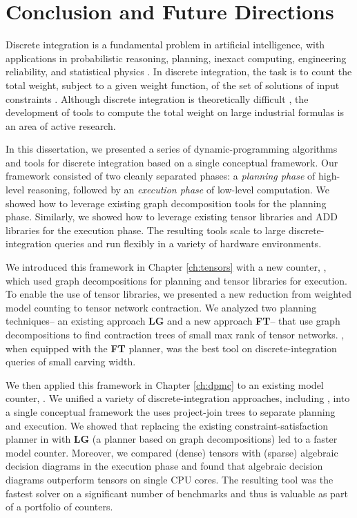 \chapter{Conclusion and Future Directions}
\label{ch:conclusion}
Discrete integration is a fundamental problem in artificial intelligence, with applications in probabilistic reasoning, planning, inexact computing, engineering reliability, and statistical physics \cite{Bacchus2003,DH07,GSS08,naveh2007constraint}. In discrete integration, the task is to count the total weight, subject to a given weight function, of the set of solutions of input constraints \cite{GSS08}. 
Although discrete integration is theoretically difficult \cite{Valiant79}, the development of tools to compute the total weight on large industrial formulas is an area of active research.

In this dissertation, we presented a series of dynamic-programming algorithms and tools for discrete integration based on a single conceptual framework.
Our framework consisted of two cleanly separated phases: a \emph{planning phase} of high-level reasoning, followed by an \emph{execution phase} of low-level computation.
We showed how to leverage existing graph decomposition tools for the planning phase.
Similarly, we showed how to leverage existing tensor libraries and ADD libraries for the execution phase.
The resulting tools scale to large discrete-integration queries and run flexibly in a variety of hardware environments.

We introduced this framework in Chapter \ref{ch:tensors} with a new counter, , which used graph decompositions for planning and tensor libraries for execution.
To enable the use of tensor libraries, we presented a new reduction from weighted model counting to tensor network contraction. 
We analyzed two planning techniques-- an existing approach \textbf{LG} and a new approach \textbf{FT}-- that use graph decompositions to find contraction trees of small max rank of tensor networks.
, when equipped with the \textbf{FT} planner, was the best tool on discrete-integration queries of small carving width.

We then applied this framework in Chapter \ref{ch:dpmc} to an existing model counter,  \cite{DPV20,phan2019weighted}.
We unified a variety of discrete-integration approaches, including , into a single conceptual framework the uses project-join trees to separate planning and execution.
We showed that replacing the existing constraint-satisfaction planner in  with \textbf{LG} (a planner based on graph decompositions) led to a faster model counter. 
Moreover, we compared (dense) tensors with (sparse) algebraic decision diagrams in the execution phase and found that algebraic decision diagrams outperform tensors on single CPU cores.
The resulting tool  was the fastest solver on a significant number of benchmarks and thus is valuable as part of a portfolio of counters.

